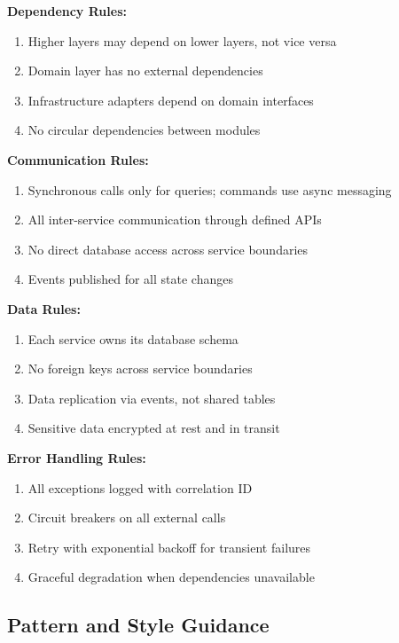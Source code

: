 \documentclass[11pt]{article}
\begin{document}
\begin{devbox}

\textbf{Dependency Rules:}
\begin{enumerate}[nosep]
    \item Higher layers may depend on lower layers, not vice versa
    \item Domain layer has no external dependencies
    \item Infrastructure adapters depend on domain interfaces
    \item No circular dependencies between modules
\end{enumerate}

\textbf{Communication Rules:}
\begin{enumerate}[nosep]
    \item Synchronous calls only for queries; commands use async messaging
    \item All inter-service communication through defined APIs
    \item No direct database access across service boundaries
    \item Events published for all state changes
\end{enumerate}

\textbf{Data Rules:}
\begin{enumerate}[nosep]
    \item Each service owns its database schema
    \item No foreign keys across service boundaries
    \item Data replication via events, not shared tables
    \item Sensitive data encrypted at rest and in transit
\end{enumerate}

\textbf{Error Handling Rules:}
\begin{enumerate}[nosep]
    \item All exceptions logged with correlation ID
    \item Circuit breakers on all external calls
    \item Retry with exponential backoff for transient failures
    \item Graceful degradation when dependencies unavailable
\end{enumerate}
\end{devbox}

\subsection{Pattern and Style Guidance}
\end{document}
